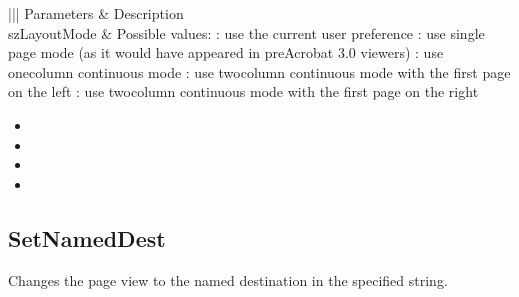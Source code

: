 \documentclass[letterpaper,12pt,english,openany,oneside]{sphinxmanual}
\begin{document}
\begin{savenotes}\sphinxattablestart
\centering
{}\label{\detokenize{IAC_API_OLE_Objects:section-101}}\nobreak
\begin{tabular}[t]{|||}
\hline
\sphinxstyletheadfamily 
Parameters
&\sphinxstyletheadfamily 
Description
\\
\hline
szLayoutMode
&
Possible values:  : use the current user preference  : use single page mode (as it would have appeared in pre\sphinxhyphen{}Acrobat 3.0 viewers)   : use one\sphinxhyphen{}column continuous mode  : use two\sphinxhyphen{}column continuous mode with the first page on the left  : use two\sphinxhyphen{}column continuous mode with the first page on the right
\\
\hline
\end{tabular}
\par
\sphinxattableend\end{savenotes}
\label{\detokenize{IAC_API_OLE_Objects:related-methods-147}}
\begin{itemize}
\item {} 
 

\item {} 
 

\item {} 
 

\item {} 
 

\end{itemize}




\subsection{SetNamedDest}
\label{\detokenize{IAC_API_OLE_Objects:setnameddest}}
Changes the page view to the named destination in the specified string.
\end{document}
